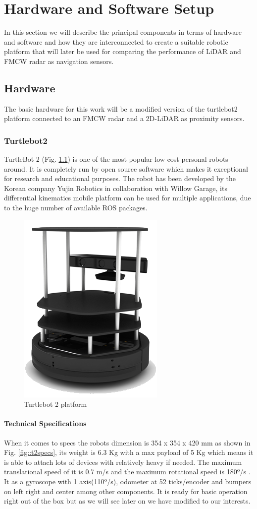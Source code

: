 \chapter{Hardware and Software Setup}

In this section we will describe the principal components in terms of hardware and software and how they are interconnected to create a suitable robotic platform that will later be used for comparing the performance of \ac{LiDAR} and \ac{FMCW} \ac{radar} as navigation sensors.


\section{Hardware}
The basic hardware for this work will be a  modified version of the  turtlebot2 platform connected to an \ac{FMCW} \ac{radar} and a 2D-\ac{LiDAR} as proximity sensors.


\subsection{Turtlebot2}
TurtleBot 2 (Fig. \ref{fig:t2}) is one of the  most popular low cost personal robots around. It is completely run by open source software which makes it exceptional for research and educational purposes. The robot has been developed by the Korean company Yujin Robotics in collaboration with Willow Garage, its differential kinematics mobile platform can be used for multiple applications, due to the huge number of available ROS packages.

\begin{figure}[h] 
\centerline{\includegraphics [width=0.3 \textwidth]{imgs/chapter4/turtlebot2.png}}
\caption{Turtlebot 2 platform}
\label{fig:t2}
\end{figure}

\subsubsection*{Technical Specifications}
When it comes to specs the robots dimension is 354 x 354 x 420 mm as shown in Fig. \ref{fig::t2specs}, its weight is 6.3 Kg with a max payload of 5 Kg which means it is able to attach lots of devices with relatively heavy if needed. The maximum translational  speed of it is 0.7 m/s and the maximum rotational speed is 180º/s . It as a gyroscope with 1 axis(110º/s), odometer at 52 ticks/encoder and  bumpers on left right and center among other components. It is ready for basic operation right out of the box but as we will see later on we have modified to our interests.

